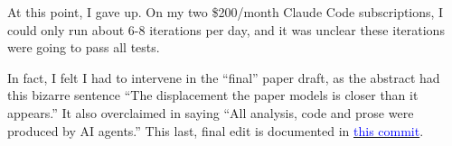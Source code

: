 \documentclass[12pt]{article}
\begin{document}
At this point, I gave up. On my two \$200/month Claude Code subscriptions, I could only run about 6-8 iterations per day, and it was unclear these iterations were going to pass all tests. 

In fact, I felt I had to intervene in the ``final'' paper draft, as the abstract had this bizarre sentence ``The displacement the paper models is closer than it appears.'' It also overclaimed in saying ``All analysis, code and prose were produced by AI agents.'' This last, final edit is documented in \href{https://github.com/chenandrewy/ralph-wiggum-asset-pricing/commit/4bed451b406d6c1190ef42e33517946c980d822d}{\textcolor{blue}{this commit}}.


\nocite{NovyMarxVelikov2025,LuEtAl2024,HadfieldMenellHadfield2018,Bengio2023,KorinekSuh2024,Zhang2019,BabinaEtAl2024,ChenLopezLiraZimmermann2022}
\printbibliography
\end{document}
